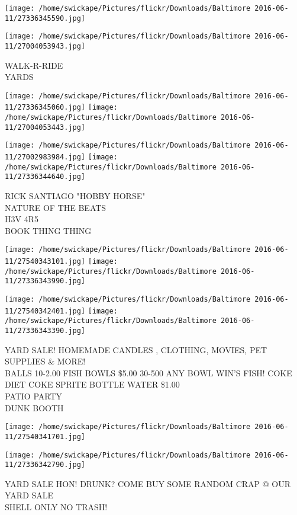 \documentclass[10pt,letterpaper]{article}
\begin{document}
\texttt{[image: /home/swickape/Pictures/flickr/Downloads/Baltimore 2016-06-11/27336345590.jpg]}

\vspace{0.25in}
\texttt{[image: /home/swickape/Pictures/flickr/Downloads/Baltimore 2016-06-11/27004053943.jpg]}

WALK{-}R{-}RIDE\\
YARDS
\pagebreak

\texttt{[image: /home/swickape/Pictures/flickr/Downloads/Baltimore 2016-06-11/27336345060.jpg]}
\texttt{[image: /home/swickape/Pictures/flickr/Downloads/Baltimore 2016-06-11/27004053443.jpg]}

\texttt{[image: /home/swickape/Pictures/flickr/Downloads/Baltimore 2016-06-11/27002983984.jpg]}
\texttt{[image: /home/swickape/Pictures/flickr/Downloads/Baltimore 2016-06-11/27336344640.jpg]}

RICK SANTIAGO "HOBBY HORSE"\\
NATURE OF THE BEATS\\
H3V 4R5\\
BOOK THING THING
\pagebreak

\texttt{[image: /home/swickape/Pictures/flickr/Downloads/Baltimore 2016-06-11/27540343101.jpg]}
\texttt{[image: /home/swickape/Pictures/flickr/Downloads/Baltimore 2016-06-11/27336343990.jpg]}

\texttt{[image: /home/swickape/Pictures/flickr/Downloads/Baltimore 2016-06-11/27540342401.jpg]}
\texttt{[image: /home/swickape/Pictures/flickr/Downloads/Baltimore 2016-06-11/27336343390.jpg]}

YARD SALE! HOMEMADE CANDLES , CLOTHING, MOVIES, PET SUPPLIES \& MORE!\\
BALLS 10{-}2.00 FISH BOWLS \$5.00 30{-}500 ANY BOWL WIN'S FISH!  COKE DIET COKE SPRITE BOTTLE WATER \$1.00\\
PATIO PARTY\\
DUNK BOOTH
\pagebreak

\texttt{[image: /home/swickape/Pictures/flickr/Downloads/Baltimore 2016-06-11/27540341701.jpg]}

\vspace{0.25in}
\texttt{[image: /home/swickape/Pictures/flickr/Downloads/Baltimore 2016-06-11/27336342790.jpg]}

YARD SALE HON!  DRUNK?  COME BUY SOME RANDOM CRAP @ OUR YARD SALE\\
SHELL ONLY NO TRASH!
\pagebreak
\end{document}
